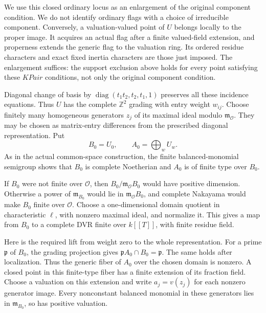 We use this closed ordinary locus as an enlargement of the
original component condition.
We do not identify ordinary flags with a choice of
irreducible component.
Conversely, a valuation-valued point of \(U\) belongs
locally to the proper image.
It acquires an actual flag after a finite valued-field
extension, and properness extends the generic flag to
the valuation ring. Its ordered residue characters and
exact fixed inertia characters are those just imposed.
The enlargement suffices: the support exclusion above
holds for every point satisfying these \(KPair\)
conditions, not only the original component condition.

Diagonal change of basis by
\(\operatorname{diag}(t_1t_2,t_2,t_1,1)\) preserves all
these incidence equations.
Thus \(U\) has the complete \(\mathbb Z^2\) grading with
entry weight \(w_{ij}\).
Choose finitely many homogeneous generators \(z_j\) of its
maximal ideal modulo \(\mathfrak m_{\mathcal O}\).
They may be chosen as matrix-entry differences from the
prescribed diagonal representation.
Put
\[
                B_0=U_0,\qquad A_0=\bigoplus_w U_w.
\]
As in the actual common-space construction, the finite
balanced-monomial semigroup shows that \(B_0\) is complete
Noetherian and \(A_0\) is of finite type over \(B_0\).

If \(B_0\) were not finite over \(\mathcal O\), then
\(B_0/\mathfrak m_{\mathcal O}B_0\) would have positive
dimension. Otherwise a power of \(\mathfrak m_{B_0}\)
would lie in \(\mathfrak m_{\mathcal O}B_0\), and complete
Nakayama would make \(B_0\) finite over \(\mathcal O\).
Choose a one-dimensional domain quotient in characteristic
\(\ell\), with nonzero maximal ideal, and normalize it.
This gives a map from \(B_0\) to a complete DVR finite over
\(k[[T]]\), with finite residue field.

Here is the required lift from weight zero to the whole
representation.
For a prime \(\mathfrak p\) of \(B_0\), the grading projection
gives
\(\mathfrak pA_0\cap B_0=\mathfrak p\).
The same holds after localization. Thus the generic fiber
of \(A_0\) over the chosen domain is nonzero.
A closed point in this finite-type fiber has a finite
extension of its fraction field.
Choose a valuation on this extension and write
\(a_j=v(z_j)\) for each nonzero generator image.
Every nonconstant balanced monomial in these generators
lies in \(\mathfrak m_{B_0}\), so has positive valuation.

